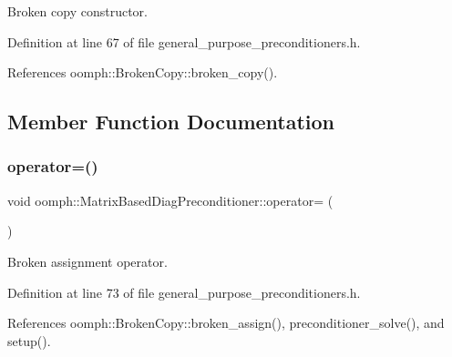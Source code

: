 Broken copy constructor. 



Definition at line 67 of file general\+\_\+purpose\+\_\+preconditioners.\+h.



References oomph\+::\+Broken\+Copy\+::broken\+\_\+copy().



\subsection{Member Function Documentation}
\mbox{\label{classoomph_1_1MatrixBasedDiagPreconditioner_a2e604fdea080deb6eca9227fc756abc6}} 
\subsubsection{\texorpdfstring{operator=()}{operator=()}}
{\footnotesize\ttfamily void oomph\+::\+Matrix\+Based\+Diag\+Preconditioner\+::operator= (\begin{DoxyParamCaption}\item[{const \hyperlink{classoomph_1_1MatrixBasedDiagPreconditioner}{Matrix\+Based\+Diag\+Preconditioner} \&}]{ }\end{DoxyParamCaption})\hspace{0.3cm}{\ttfamily [inline]}}



Broken assignment operator. 



Definition at line 73 of file general\+\_\+purpose\+\_\+preconditioners.\+h.



References oomph\+::\+Broken\+Copy\+::broken\+\_\+assign(), preconditioner\+\_\+solve(), and setup().

\mbox{\label{classoomph_1_1MatrixBasedDiagPreconditioner_a202ee7ff4183a585a0b9bd772e2cbcc1}} 
